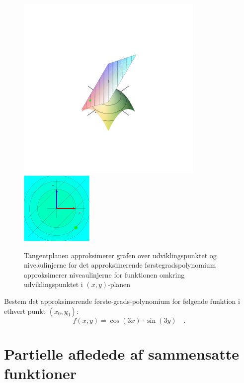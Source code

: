 \begin{figure}[h]
\centerline{\includegraphics[height=90mm]{plotParabPlanUP.pdf} \quad \includegraphics[height=35mm]{plotParabPlanNiveau.pdf}}
\begin{center}
\caption{Tangentplanen approksimerer grafen over udviklingspunktet og niveaulinjerne for det approksimerende førstegradspolynomium approksimerer niveaulinjerne for funktionen omkring udviklingspunktet i $(x, y)$-planen} \label{figParabPlan}
\end{center}
\end{figure}


\begin{exercise}
Bestem det approksimerende første-grads-polynomium for følgende funktion i ethvert punkt $(x_{0}, y_{0})$:
\begin{equation}
f(x,y) = \cos(3x)\cdot \sin(3y) \quad .
\end{equation}
\end{exercise}






\section{Partielle afledede af sammensatte funktioner}


